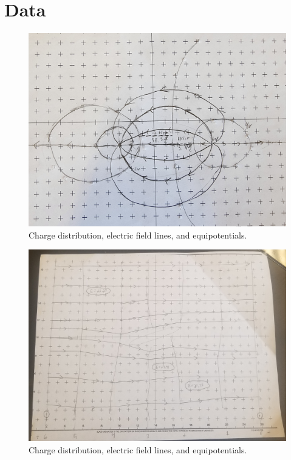 \documentclass[12pt]{article}
\begin{document}
    \section{Data}
        \begin{figure}[H]
            \centering
            \includegraphics[width=0.8\linewidth]{Ryan's Lines.jpg}
            \caption{Charge distribution, electric field lines, and equipotentials.}
        \end{figure}
        \begin{figure}[H]
            \centering
            \includegraphics[width=0.8\linewidth]{Ben's Lines.jpg}
            \caption{Charge distribution, electric field lines, and equipotentials.}
        \end{figure}
\end{document}
